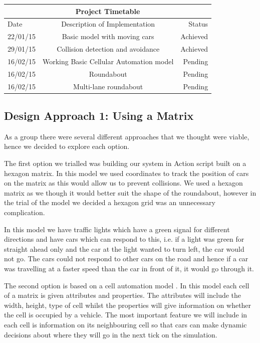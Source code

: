 \documentclass[11pt]{article}
\begin{document}
	
	\begin{tabular}{ | l | c | r | }
		\hline
		\multicolumn{3}{|c|}{Project Timetable}  \\ \hline
		Date & Description of Implementation & Status \\ \hline
		22/01/15 & Basic model with moving cars &  Achieved \\ \hline
		29/01/15 & Collision detection and avoidance & Achieved \\ \hline
		16/02/15 & Working Basic Cellular Automation model & Pending \\ \hline
		16/02/15 & Roundabout & Pending \\ \hline
		16/02/15 & Multi-lane roundabout & Pending \\ \hline
		
	\end{tabular}
	\subsection{Design Approach 1: Using a Matrix}
	As a group there were several different approaches that we thought were viable, hence we decided to explore each option.
	
	The first option we trialled was building our system in Action script built on a hexagon matrix. In this model we used coordinates to track the position of cars on the matrix as this would allow us to prevent collisions. We used a hexagon matrix as we though it would better suit the shape of the roundabout, however in the trial of the model we decided a hexagon grid was an unnecessary complication. 
	
	In this model we have traffic lights which have a green signal for different directions and have cars which can respond to this, i.e. if a light was green for straight ahead only and the car at the light wanted to turn left, the car would not go. The cars could not respond to other cars on the road and hence if a car was travelling at a faster speed than the car in front of it, it would go through it.
	
	The second option is based on a cell automation model \cite{namekawa2005general}. In this model each cell of a matrix is given attributes and properties. The attributes will include the width, height, type of cell whilst the properties will give information on whether the cell is occupied by a vehicle. The most important feature we will include in each cell is information on its neighbouring cell so that cars can make dynamic decisions about where they will go in the next tick on the simulation.
	
\end{document}
